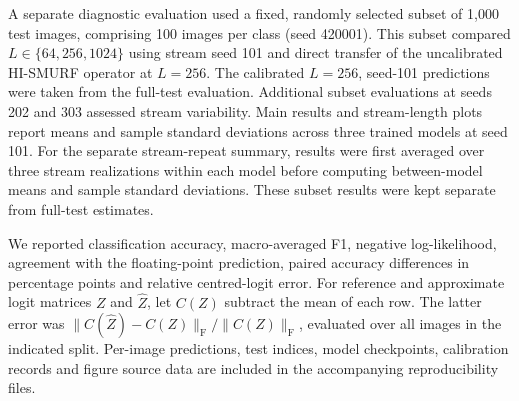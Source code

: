 A separate diagnostic evaluation used a fixed, randomly selected subset
of 1,000 test images, comprising 100 images per class (seed 420001).
This subset compared $L\in\{64,256,1024\}$ using stream seed 101 and
direct transfer of the uncalibrated HI-SMURF operator at $L=256$.
The calibrated $L=256$, seed-101 predictions were taken from the full-test
evaluation. Additional subset evaluations at seeds 202 and 303 assessed
stream variability. Main results and stream-length plots report means and
sample standard deviations across three trained models at seed 101.
For the separate stream-repeat summary, results were first averaged over
three stream realizations within each model before computing between-model
means and sample standard deviations. These subset results were kept
separate from full-test estimates.

We reported classification accuracy, macro-averaged F1, negative
log-likelihood, agreement with the floating-point prediction, paired
accuracy differences in percentage points and relative centred-logit
error. For reference and approximate logit matrices $Z$ and $\widehat Z$,
let $C(Z)$ subtract the mean of each row. The latter error was
$\|C(\widehat Z)-C(Z)\|_{\mathrm F}/\|C(Z)\|_{\mathrm F}$,
evaluated over all images in the indicated split. Per-image predictions,
test indices, model checkpoints, calibration records and figure source
data are included in the accompanying reproducibility files.
